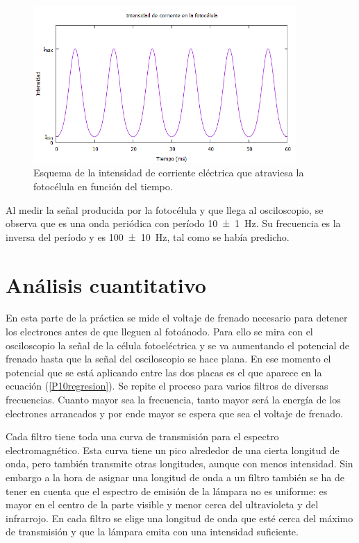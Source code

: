 \documentclass[12pt]{article}
\numberwithin{table}{section}
\numberwithin{figure}{section}
\numberwithin{equation}{section}
\newcommand{\data}[3]{\SI{#1 \pm #2}{#3}}
\begin{document}
\begin{figure}[!ht]
	\begin{center}
		\includegraphics[width=10cm]{P10Intensidadfotocelula.png}
		\caption{Esquema de la intensidad de corriente eléctrica que atraviesa la fotocélula en función del tiempo.}\label{P10intensidadfotocelula}
	\end{center}
\end{figure}

Al medir la señal producida por la fotocélula y que llega al osciloscopio, se observa que es una onda periódica con período \data{10}{1}{Hz}. Su frecuencia es la inversa del período y es \data{100}{10}{Hz}, tal como se había predicho.

\section{Análisis cuantitativo}
En esta parte de la práctica se mide el voltaje de frenado  necesario para detener los electrones antes de que lleguen al fotoánodo. Para ello se mira con el osciloscopio la señal de la célula fotoeléctrica y se va aumentando el potencial de frenado hasta que la señal del osciloscopio se hace plana. En ese momento el potencial que se está aplicando entre las dos placas es el que aparece en la ecuación (\ref{P10regresion}). Se repite el proceso para varios filtros de diversas frecuencias. Cuanto mayor sea la frecuencia, tanto mayor será la energía de los electrones arrancados y por ende mayor se espera que sea el voltaje de frenado.

Cada filtro tiene toda una curva de transmisión para el espectro electromagnético. Esta curva tiene un pico alrededor de una cierta longitud de onda, pero también transmite otras longitudes, aunque con menos intensidad. Sin embargo a la hora de asignar una longitud de onda a un filtro también se ha de tener en cuenta que el espectro de emisión de la lámpara no es uniforme: es mayor en el centro de la parte visible y menor cerca del ultravioleta y del infrarrojo. En cada filtro se elige una longitud de onda que esté cerca del máximo de transmisión y que la lámpara emita con una intensidad suficiente.
\end{document}
